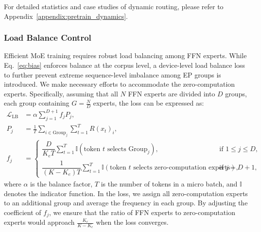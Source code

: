 \documentclass{article}
\newcommand{\kmax}{K}
\begin{document}
For detailed statistics and case studies of dynamic routing, please refer to Appendix~\ref{appendix:pretrain_dynamics}.


\subsubsection{Load Balance Control}
Efficient MoE training requires robust load balancing among FFN experts. While Eq.~\eqref{eq:bias} enforces balance at the corpus level, a device-level load balance loss \citep{deepseekai2025deepseekv3technicalreport} to further prevent extreme sequence-level imbalance among EP groups is introduced. We make necessary efforts to accommodate the zero-computation experts. Specifically, assuming that all $N$ FFN experts are divided into $D$ groups, each group containing $G=\frac{N}{D}$ experts, the loss can be expressed as:
\begin{align}
    \mathcal{L}_{\text{LB}} &= \alpha \sum_{j=1}^{D+1} f_j P_j, \label{eq:loss_lb}\\
    P_j &= \frac{1}{T} \sum_{i \in \text{Group}_j}\sum_{t=1}^T R(x_t)_i, \label{eq:pj}\\
    f_j &= \begin{cases}
        \dfrac{D}{K_e T}\displaystyle\sum_{t=1}^T \mathbb{I}(\text{token } t \text{ selects Group}_j), & \text{if } 1 \leq j \leq D, \\[3mm]
        \dfrac{1}{(K-K_e)T}\displaystyle\sum_{t=1}^T \mathbb{I}(\text{token } t \text{ selects zero-computation experts}), & \text{if } j = D+1,
    \end{cases} \label{eq:fj}
\end{align}
where $\alpha$ is the balance factor, $T$ is the number of tokens in a micro batch, and $\mathbb{I}$ denotes the indicator function. In the loss, we assign all zero-computation experts to an additional group and average the frequency in each group. By adjusting the coefficient of $f_j$, we ensure that the ratio of FFN experts to zero-computation experts would approach $\frac{K_e}{\kmax-K_e}$ when the loss converges.
\end{document}
